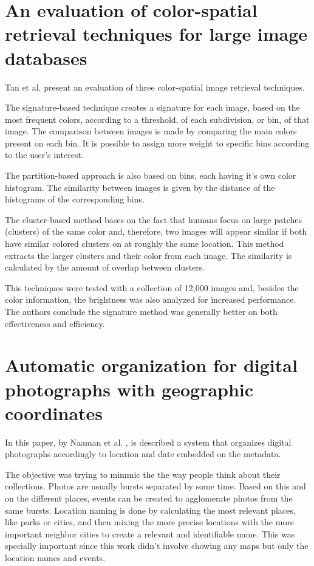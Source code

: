 

\section{An evaluation of color-spatial retrieval techniques for large image databases} %
\label{sub:Tan}

Tan et al. \cite{Tan:2001p850} present an evaluation of three color-spatial image retrieval techniques.

The signature-based technique creates a signature for each image, based on the most frequent colors, according to a threshold, of each subdivision, or bin, of that image. The comparison between images is made by comparing the main colors present on each bin. It is possible to assign more weight to specific bins according to the user's interest.

The partition-based approach is also based on bins, each having it's own color histogram. The similarity between images is given by the distance of the histograms of the corresponding bins.

The cluster-based method bases on the fact that humans focus on large patches (clusters) of the same color and, therefore, two images will appear similar if both have similar colored clusters on at roughly the same location. This method extracts the larger clusters and their color from each image. The similarity is calculated by the amount of overlap between clusters.

This techniques were tested with a collection of 12,000 images and, besides the color information, the brightness was also analyzed for increased performance. The authors conclude the signature method was generally better on both effectiveness and efficiency.


\section{Automatic organization for digital photographs with geographic coordinates} %
\label{sub:Naaman}

In this paper, by Naaman et al. \cite{Naaman:2004p1802}, is described a system that organizes digital photographs accordingly to location and date embedded on the metadata.

The objective was trying to mimmic the the way people think about their collections. Photos are usually bursts separated by some time. Based on this and on the different places, events can be created to agglomerate photos from the same bursts. Location naming is done by calculating the most relevant places, like parks or cities, and then mixing the more precise locations with the more important neighbor cities to create a relevant and identifiable name. This was specially important since this work didn't involve showing any maps but only the location names and events.

